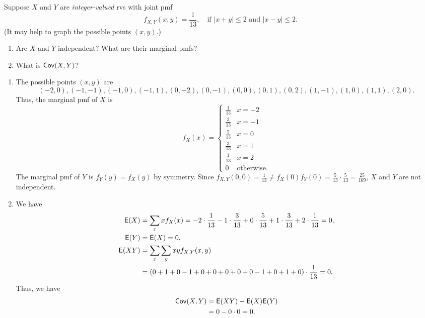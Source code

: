 \documentclass[12pt]{article}
\newcommand{\E}{{\sf E}}
\newcommand{\Cov}{{\sf Cov}}
\newenvironment{problem}[2][Problem]{\begin{trivlist}
\item[\hskip \labelsep {\bfseries #1}\hskip \labelsep {\bfseries #2.}]}
{\end{trivlist}}
\begin{document}
\begin{problem}{7}
  Suppose $X$ and $Y$ are \textit{integer-valued} rvs with joint pmf
  \[
    f_{X,Y}(x, y) = \frac{1}{13}, \quad 
    \text{if } |x + y| \leq 2 \text{ and } |x - y| \leq 2.
  \]
  (It may help to graph the possible points $(x, y)$.)
  \begin{enumerate}
    \item Are $X$ and $Y$ independent? What are their marginal pmfs?
    \item What is $\Cov(X, Y)$?
  \end{enumerate}
  \begin{enumerate}
    \item The possible points $(x, y)$ are
    \[
      (-2, 0), (-1, -1), (-1, 0), (-1, 1), (0, -2), (0, -1), (0, 0), 
      (0, 1), (0, 2), (1, -1), (1, 0), (1, 1), (2, 0).
    \]
    Thus, the marginal pmf of $X$ is
    \[
      f_X(x) = \begin{cases}
        \frac{1}{13} & x = -2 \\
        \frac{3}{13} & x = -1 \\
        \frac{5}{13} & x = 0 \\
        \frac{3}{13} & x = 1 \\
        \frac{1}{13} & x = 2 \\
        0 & \text{otherwise.}
      \end{cases}
    \]
    The marginal pmf of $Y$ is $f_Y(y) = f_X(y)$ by symmetry.
    Since $f_{X,Y}(0,0) = \frac{1}{13} \neq f_X(0) f_Y(0) = 
    \frac{5}{13} \cdot \frac{5}{13} = \frac{25}{169}$, $X$ and $Y$ are not independent.
    \item We have
    \begin{align*}
      \E(X) &= \sum_x x f_X(x) = -2 \cdot \frac{1}{13} - 1 \cdot \frac{3}{13} 
      + 0 \cdot \frac{5}{13} + 1 \cdot \frac{3}{13} + 2 \cdot \frac{1}{13} = 0, \\
      \E(Y) &= \E(X) = 0, \\
      \E(XY) &= \sum_x \sum_y xy f_{X,Y}(x,y) \\
      &= (0 + 1 + 0 - 1 + 0 + 0 + 0 + 0 + 0 - 1 + 0 + 1 + 0) 
      \cdot \frac{1}{13} = 0.
    \end{align*}
    Thus, we have
    \begin{align*}
      \Cov(X, Y) &= \E(XY) - \E(X) \E(Y) \\
      &= 0 - 0 \cdot 0 = 0.
    \end{align*}
  \end{enumerate}
\end{problem}
\end{document}
